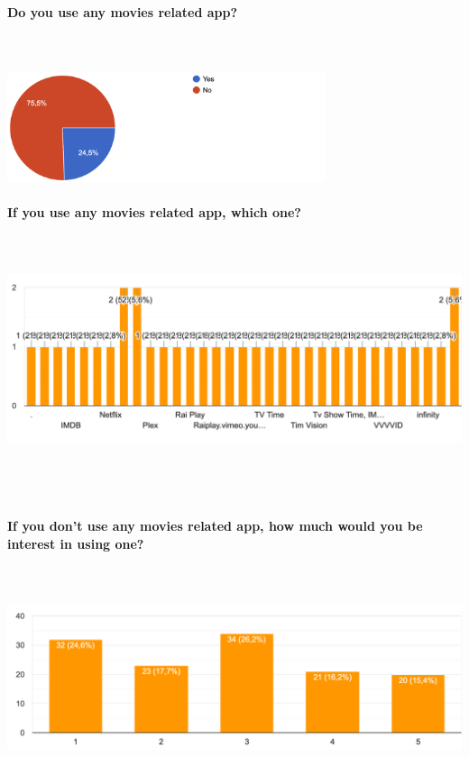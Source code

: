 \documentclass[12pt, a4paper]{article}
\numberwithin{figure}{section}
\begin{document}
\paragraph{Do you use any movies related app?}\mbox{}\\\\
\includegraphics[width=0.7\textwidth]{Images/app.png}\\

\paragraph{If you use any movies related app, which one?}\mbox{}\\\\
\includegraphics[width=1\textwidth]{images/appUsed.png}\\\\\\\\

\paragraph{If you don't use any movies related app, how much would you be interest in using one?}\mbox{}\\\\
\includegraphics[width=1\textwidth]{images/interesting.png}\\
\end{document}
